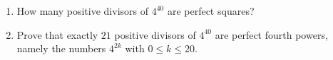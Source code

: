 \begin{enumerate}
\item[(a)] How many positive divisors of $4^{40}$ are perfect squares?
\item[(b)] Prove that exactly $21$ positive divisors of $4^{40}$ are perfect fourth powers, namely the numbers $4^{2k}$ with $0\le k\le20$.
\end{enumerate}

